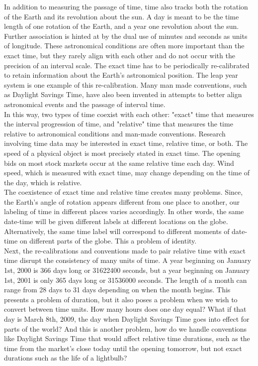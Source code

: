 \documentclass[article]{jss}
\begin{document}
In addition to measuring the passage of time, time also tracks both the rotation of the Earth and its revolution about the sun.  A day is meant to be the time length of one rotation of the Earth, and a year one revolution about the sun.  Further association is hinted at by the dual use of minutes and seconds as units of longitude.  These astronomical conditions are often more important than the exact time, but they rarely align with each other and do not occur with the precision of an interval scale.  The exact time has to be periodically re-calibrated to retain information about the Earth's astronomical position.  The leap year system is one example of this re-calibration. Many man made conventions, such as Daylight Savings Time, have also been invented in attempts to better align astronomical events and the passage of interval time.\\

In this way, two types of time coexist with each other: "exact" time that measures the interval progression of time, and "relative" time that measures the time relative to astronomical conditions and man-made conventions. Research involving time data may be interested in exact time, relative time, or both. The speed of a physical object is most precisely stated in exact time. The opening bids on most stock markets occur at the same relative time each day.  Wind speed, which is measured with exact time, may change depending on the time of the day, which is relative.\\ 

The coexistence of exact time and relative time creates many problems. Since, the Earth's angle of rotation appears different from one place to another, our labeling of time in different places varies accordingly. In other words, the same date-time will be given different labels at different locations on the globe. Alternatively, the same time label will correspond to different moments of date-time on different parts of the globe.  This a problem of identity.\\

Next, the re-calibrations and conventions made to pair relative time with exact time disrupt the consistency of many units of time.  A year beginning on January 1st, 2000 is 366 days long or 31622400 seconds, but a year beginning on January 1st, 2001 is only 365 days long or 31536000 seconds.  The length of a month can range from 28 days to 31 days depending on when the month begins. This presents a problem of duration, but it also poses a problem when we wish to convert between time units. How many hours does one day equal? What if that day is March 8th, 2009, the day when Daylight Savings Time goes into effect for parts of the world?
And this is another problem, how do we handle conventions like Daylight Savings Time that would affect relative time durations, such as the time from the market's close today until the opening tomorrow, but not exact durations such as the life of a lightbulb?\\
\end{document}
